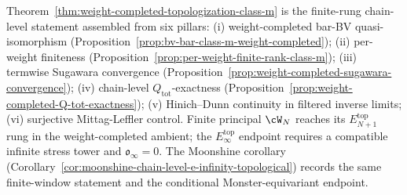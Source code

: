 Theorem~\ref{thm:weight-completed-topologization-class-m} is the
finite-rung chain-level statement assembled from six pillars: (i)
weight-completed bar-BV quasi-isomorphism
(Proposition~\ref{prop:bv-bar-class-m-weight-completed}); (ii)
per-weight finiteness
(Proposition~\ref{prop:per-weight-finite-rank-class-m}); (iii)
termwise Sugawara convergence
(Proposition~\ref{prop:weight-completed-sugawara-convergence}); (iv)
chain-level $Q_{\mathrm{tot}}$-exactness
(Proposition~\ref{prop:weight-completed-Q-tot-exactness}); (v)
Hinich--Dunn continuity in filtered inverse limits; (vi) surjective
Mittag-Leffler control. Finite principal $\cW_N$ reaches its
$E_{N+1}^{\mathrm{top}}$ rung in the weight-completed ambient; the
$E_\infty^{\mathrm{top}}$ endpoint requires a compatible infinite
stress tower and $\mathfrak{o}_{\infty}=0$. The Moonshine corollary
(Corollary~\ref{cor:moonshine-chain-level-e-infinity-topological})
records the same finite-window statement and the conditional
Monster-equivariant endpoint.
